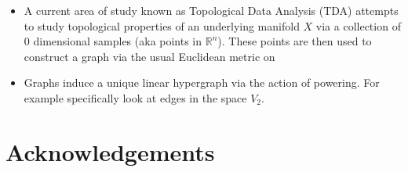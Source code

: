 \documentclass{article}
\begin{document}
\begin{itemize}
    \item  A current area of study known as Topological Data Analysis (TDA) attempts to study topological properties of an underlying manifold $X$ via a collection of 0 dimensional samples (aka points in $\mathbb{R}^n$). These points are then used to construct a graph via the usual Euclidean metric on
    \item Graphs induce a unique linear hypergraph via the action of powering. For example specifically look at edges in the space $V_2$.  
\end{itemize}

\section*{Acknowledgements}



\end{document}
